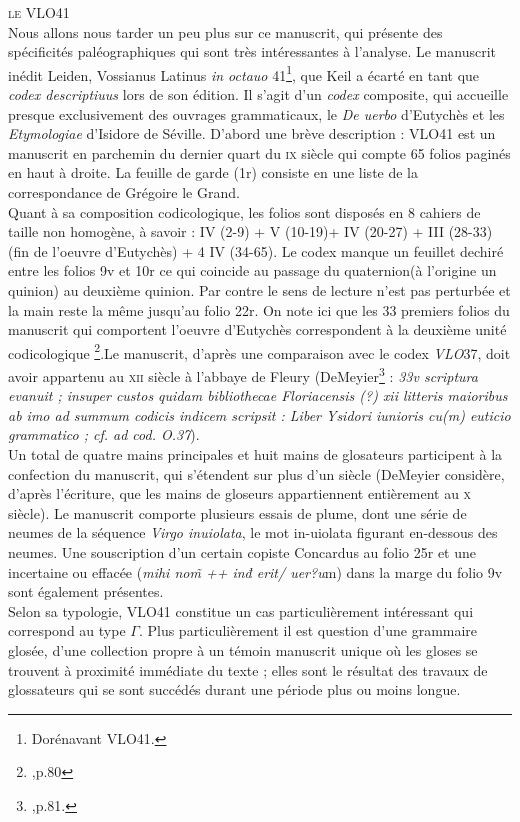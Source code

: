 \documentclass[a4paper, twoside, 12pt]{book}
\begin{document}
\textsc{le VLO41}\\

Nous allons nous tarder un peu plus sur ce manuscrit, qui présente des spécificités paléographiques qui sont très intéressantes à l'analyse. Le manuscrit inédit  Leiden, Vossianus Latinus \textit{in octauo} 41\footnote{Dorénavant VLO41.}, que Keil a écarté en tant que \textit{codex descriptiuus} lors de son édition. Il s'agit d'un \textit{codex} composite, qui accueille presque exclusivement des ouvrages grammaticaux, le  \textit{De uerbo} d'Eutychès et les \textit{Etymologiae} d'Isidore de Séville. D'abord une brève description : VLO41 est un manuscrit en parchemin du dernier quart du \textsc{ix}\ieme{} siècle qui compte  65 folios paginés en haut à droite. La feuille de garde (1r) consiste en une liste de la correspondance de Grégoire le Grand.\\

Quant à sa composition codicologique,  les folios sont disposés en 8 cahiers de taille non homogène, à savoir : IV (2-9) + V (10-19)+ IV (20-27) + III (28-33) (fin de l'oeuvre d'Eutychès) + 4 IV (34-65). Le codex manque un feuillet dechiré entre les folios 9v et 10r ce qui coincide au passage du quaternion(à l'origine un quinion) au deuxième quinion. Par contre le sens de lecture n'est pas perturbée et la main reste la même jusqu'au folio 22r. On note ici que les 33 premiers folios du manuscrit qui comportent l'oeuvre d'Eutychès correspondent à la deuxième unité codicologique \footnote{\cite{de1973codices},p.80}.Le manuscrit, d'après une comparaison avec le codex \textit{VLO}37, doit avoir appartenu au \textsc{xii}\ieme{} siècle à l'abbaye de Fleury (DeMeyier\footnote{\cite{de1973codices},p.81.} : \textit{33v scriptura evanuit ; insuper custos quidam bibliothecae Floriacensis (?) xii litteris maioribus ab imo ad summum codicis indicem scripsit : Liber Ysidori iunioris cu(m) euticio grammatico ; cf. ad cod. O.37}).\\

Un total de quatre mains principales et huit mains de glosateurs participent à la confection du manuscrit, qui s'étendent sur plus d'un siècle (DeMeyier considère, d'après l'écriture, que les mains de gloseurs appartiennent entièrement au \textsc{x}\ieme{} siècle). Le manuscrit comporte plusieurs essais de plume, dont une série de neumes de la séquence \textit{Virgo inuiolata}, le mot in-uiolata figurant en-dessous des neumes. Une souscription d'un certain copiste Concardus au folio 25r et une incertaine ou effacée (\textit{mihi nom̃ ++ inđ erit/ uer?u}m) dans la marge du folio 9v sont également présentes. \\
Selon sa typologie, VLO41 constitue un cas particulièrement intéressant qui correspond au type $\Gamma$. Plus particulièrement il est question d'une grammaire glosée, d'une collection propre à un témoin manuscrit unique où les gloses se trouvent à proximité immédiate du texte ; elles sont le résultat des travaux de glossateurs qui se sont succédés durant une période plus ou moins longue. \\
\end{document}

